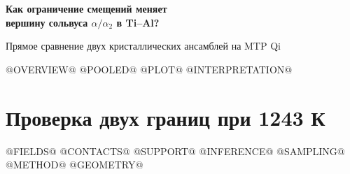 \documentclass[11pt,a4paper]{article}
\begin{document}
\thispagestyle{plain}
{\sffamily\bfseries\fontsize{22}{24}\selectfont\color{ink}Как ограничение смещений меняет\\вершину сольвуса \(\alpha/\alpha_2\) в Ti--Al?\par}
{\large\sffamily\color{muted}Прямое сравнение двух кристаллических ансамблей на MTP Qi\par}
\vspace{1mm}{\color{loose}\rule{\linewidth}{1.1pt}}
@OVERVIEW@
@POOLED@
@PLOT@
@INTERPRETATION@
\clearpage
\section*{Проверка двух границ при 1243 К}
@FIELDS@
@CONTACTS@
@SUPPORT@
\clearpage
@INFERENCE@
@SAMPLING@
\clearpage
@METHOD@
@GEOMETRY@
\end{document}
